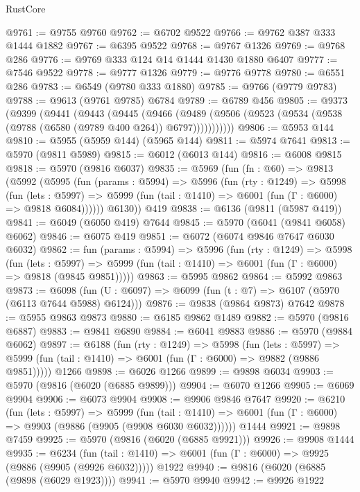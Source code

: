 \begin{lexlean}{RustCore}
\begin{coremodule}
@9761 := @9755 @9760
@9762 := @6702 @9522
@9766 := @9762 @387 @333 @1444 @1882
@9767 := @6395 @9522
@9768 := @9767 @1326
@9769 := @9768 @286
@9776 := @9769 @333 @124 @14 @1444 @1430 @1880 @6407
@9777 := @7546 @9522
@9778 := @9777 @1326
@9779 := @9776 @9778
@9780 := @6551 @286
@9783 := @6549 (@9780 @333 @1880)
@9785 := @9766 (@9779 @9783)
@9788 := @9613 (@9761 @9785) @6784
@9789 := @6789 @456
@9805 := @9373
    (@9399
      (@9441
        (@9443
          (@9445
            (@9466
              (@9489 (@9506 (@9523 (@9534 (@9538 (@9788 (@6580 (@9789 @400 @264)) @6797)))))))))))
@9806 := @5953 @144
@9810 := @5955 (@5959 @144) (@5965 @144)
@9811 := @5974 @7641
@9813 := @5970 (@9811 @5989)
@9815 := @6012 (@6013 @144)
@9816 := @6008 @9815
@9818 := @5970 (@9816 @6037)
@9835 := @5969
    (fun (fn : @60) =>
    @9813
      (@5992
        (@5995
          (fun (params : @5994) =>
          @5996
            (fun (rty : @1249) =>
            @5998
              (fun (lets : @5997) =>
              @5999 (fun (tail : @1410) => @6001 (fun (Γ : @6000) => @9818 @6084))))))
        @6130))
    @419
@9838 := @6136 (@9811 (@5987 @419))
@9841 := @6049 (@6050 @419) @7644
@9845 := @5970 (@6041 (@9841 @6058) @6062)
@9846 := @6075 @419
@9851 := @6072 (@6074 @9846 @7647 @6030 @6032)
@9862 := fun (params : @5994) =>
  @5996
    (fun (rty : @1249) =>
    @5998
      (fun (lets : @5997) =>
      @5999 (fun (tail : @1410) => @6001 (fun (Γ : @6000) => @9818 (@9845 @9851)))))
@9863 := @5995 @9862
@9864 := @5992 @9863
@9873 := @6098 (fun (U : @6097) => @6099 (fun (t : @7) => @6107 (@5970 (@6113 @7644 @5988) @6124)))
@9876 := @9838 (@9864 @9873) @7642
@9878 := @5955 @9863 @9873
@9880 := @6185 @9862 @1489
@9882 := @5970 (@9816 @6887)
@9883 := @9841 @6890
@9884 := @6041 @9883
@9886 := @5970 (@9884 @6062)
@9897 := @6188
    (fun (rty : @1249) =>
    @5998
      (fun (lets : @5997) =>
      @5999 (fun (tail : @1410) => @6001 (fun (Γ : @6000) => @9882 (@9886 @9851)))))
    @1266
@9898 := @6026 @1266
@9899 := @9898 @6034
@9903 := @5970 (@9816 (@6020 (@6885 @9899)))
@9904 := @6070 @1266
@9905 := @6069 @9904
@9906 := @6073 @9904
@9908 := @9906 @9846 @7647
@9920 := @6210
    (fun (lets : @5997) =>
    @5999
      (fun (tail : @1410) => @6001 (fun (Γ : @6000) => @9903 (@9886 (@9905 (@9908 @6030 @6032))))))
    @1444
@9921 := @9898 @7459
@9925 := @5970 (@9816 (@6020 (@6885 @9921)))
@9926 := @9908 @1444
@9935 := @6234
    (fun (tail : @1410) => @6001 (fun (Γ : @6000) => @9925 (@9886 (@9905 (@9926 @6032)))))
    @1922
@9940 := @9816 (@6020 (@6885 (@9898 (@6029 @1923))))
@9941 := @5970 @9940
@9942 := @9926 @1922

\end{coremodule}
\end{lexlean}
